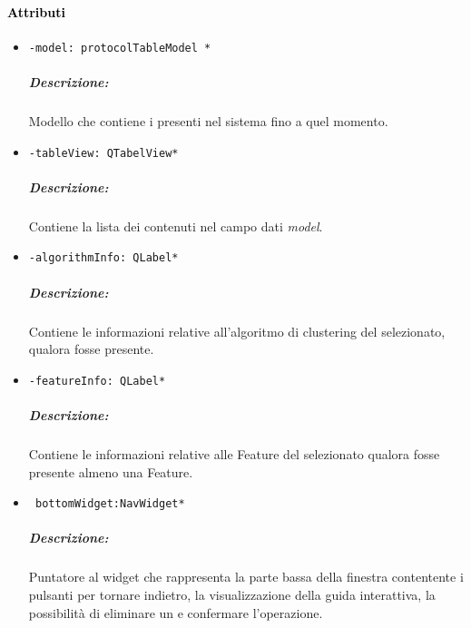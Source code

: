\paragraph{\textcolor{black}{Attributi\\}}
\begin{itemize}
\item\color{teal}\verb!-model: protocolTableModel *!
\color{black}
\subparagraph{Descrizione:}Modello che contiene i \protocol{} presenti nel sistema fino a quel momento.

\item\color{teal}\verb!-tableView: QTabelView*!
\color{black}
\subparagraph{Descrizione:}
Contiene la lista dei \protocol{} contenuti nel campo dati \emph{model}.

\item\color{teal}\verb!-algorithmInfo: QLabel*!
\color{black}
\subparagraph{Descrizione:}
Contiene le informazioni relative all'algoritmo di clustering\g{} del \protocol{} selezionato, qualora fosse presente.

\item\color{teal}\verb!-featureInfo: QLabel*!
\color{black}
\subparagraph{Descrizione:}
Contiene le informazioni relative alle Feature\g{} del \protocol{} selezionato qualora fosse presente almeno una Feature\g{}.

\item\color{teal}\verb! bottomWidget:NavWidget*!
\color{black} 
\subparagraph{Descrizione:}
Puntatore al widget che rappresenta la parte bassa della finestra contentente i pulsanti per tornare indietro, la visualizzazione della guida interattiva, la possibilità di eliminare un \protocol{} e confermare l'operazione.
\end{itemize}
